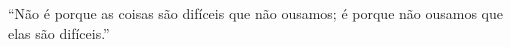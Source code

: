 ``Não é porque as coisas são difíceis que não ousamos; é porque não ousamos que elas são difíceis.''


